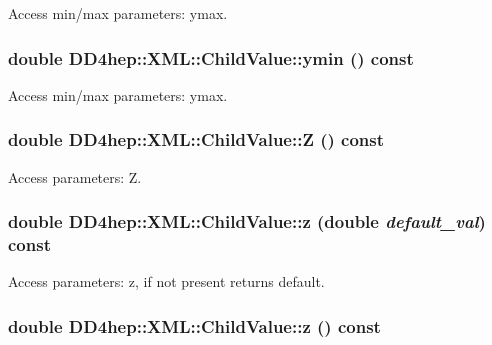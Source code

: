 Access min/max parameters: ymax. \hypertarget{struct_d_d4hep_1_1_x_m_l_1_1_child_value_aa9ae9ece68a27b9f5b8388eb9917a800}{
\subsubsection[{ymin}]{\setlength{\rightskip}{0pt plus 5cm}double DD4hep::XML::ChildValue::ymin () const}}
\label{struct_d_d4hep_1_1_x_m_l_1_1_child_value_aa9ae9ece68a27b9f5b8388eb9917a800}


Access min/max parameters: ymax. \hypertarget{struct_d_d4hep_1_1_x_m_l_1_1_child_value_a98529f5536296558e3580cebb183f1fc}{
\subsubsection[{Z}]{\setlength{\rightskip}{0pt plus 5cm}double DD4hep::XML::ChildValue::Z () const}}
\label{struct_d_d4hep_1_1_x_m_l_1_1_child_value_a98529f5536296558e3580cebb183f1fc}


Access parameters: Z. \hypertarget{struct_d_d4hep_1_1_x_m_l_1_1_child_value_ab69c51a9ae6ae6f93a073f80d069aa2a}{
\subsubsection[{z}]{\setlength{\rightskip}{0pt plus 5cm}double DD4hep::XML::ChildValue::z (double {\em default\_\-val}) const}}
\label{struct_d_d4hep_1_1_x_m_l_1_1_child_value_ab69c51a9ae6ae6f93a073f80d069aa2a}


Access parameters: z, if not present returns default. \hypertarget{struct_d_d4hep_1_1_x_m_l_1_1_child_value_a2d3ea2df66ead260e1b8778537a4ec3e}{
\subsubsection[{z}]{\setlength{\rightskip}{0pt plus 5cm}double DD4hep::XML::ChildValue::z () const}}
\label{struct_d_d4hep_1_1_x_m_l_1_1_child_value_a2d3ea2df66ead260e1b8778537a4ec3e}



